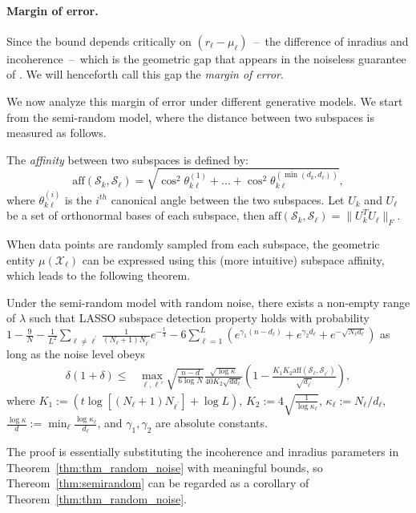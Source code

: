 \documentclass{ctexart}
\begin{document}


\paragraph{Margin of error.}
Since the bound depends critically on $(r_\ell-\mu_\ell)$~--~the difference of inradius and incoherence~--~which is the geometric gap that appears in the noiseless guarantee of \cite{soltanolkotabi2011geometric}. We will henceforth call this gap the \emph{margin of error}.

We now analyze this margin of error under different generative models. We
start from the semi-random model, where the distance between two subspaces is measured as follows.
\begin{definition}\label{def:subspace_affinity}
The {\em affinity} between two subspaces is defined by:
$$ \mathrm{aff}(\mathcal{S}_k,\mathcal{S}_{\ell}) = \sqrt{\cos^2{\theta^{(1)}_{k\ell }}+...+\cos^2{\theta^{(\min(d_k,d_{\ell}))}_{k\ell}}},$$
where $\theta_{k\ell}^{(i)}$ is the $i^{th}$ canonical angle between the two subspaces. Let $U_{k}$ and $U_{\ell}$ be a set of orthonormal bases of each subspace, then $\mathrm{aff}(\mathcal{S}_k,\mathcal{S}_{\ell})=\|U_{k}^TU_{\ell}\|_F$.
\end{definition}
When data points are randomly sampled from each subspace, the geometric entity $\mu(\mathcal{X}_{\ell})$ can be expressed using this (more intuitive) subspace affinity, which leads to the following theorem.


\begin{theorem}\label{thm:semirandom}
Under the semi-random model with random noise, there exists a non-empty range of $\lambda$ such that LASSO subspace detection property holds with probability $1- \frac{9}{N} - \frac{1}{L^2}\sum_{\ell\neq \ell^\prime}\frac{1}{(N_{\ell}+1)N_{\ell^\prime}} e^{-\frac{t}{4}} -6\sum_{\ell=1}^L (e^{\gamma_1 (n-d_\ell)}+e^{\gamma_2 d_\ell}+e^{-\sqrt{N_{\ell}d_{\ell}}})$ as long as the noise level obeys
\begin{align*}
 \delta(1+\delta) \leq& \max_{\ell,\ell'}\sqrt{\frac{n-d}{6\log N}} \frac{\sqrt{\log \kappa}}{40K_2\sqrt{dd_\ell}}\left(1- \frac{K_1K_2 \mathrm{aff}(\mathcal{S}_{\ell},\mathcal{S}_{\ell^\prime})}{\sqrt{ d_{\ell^\prime}}} \right),
\end{align*}
where $K_1:= (t \log  [(N_{\ell}+1)N_{\ell^\prime}] + \log L)$, $K_2 := 4\sqrt{\frac{1}{\log\kappa_\ell}}$, $\kappa_\ell := N_{\ell}/d_{\ell}$, $\frac{\log\kappa}{d} :=\min_{\ell} \frac{\log\kappa_\ell}{d_\ell}$, and
$\gamma_1,\gamma_2$ are absolute constants.
\end{theorem}
The proof is essentially substituting the incoherence and inradius parameters in Theorem~\ref{thm:thm_random_noise} with meaningful bounds, so Thereom~\ref{thm:semirandom} can be regarded as a corollary of Theorem~\ref{thm:thm_random_noise}.
\end{document}
